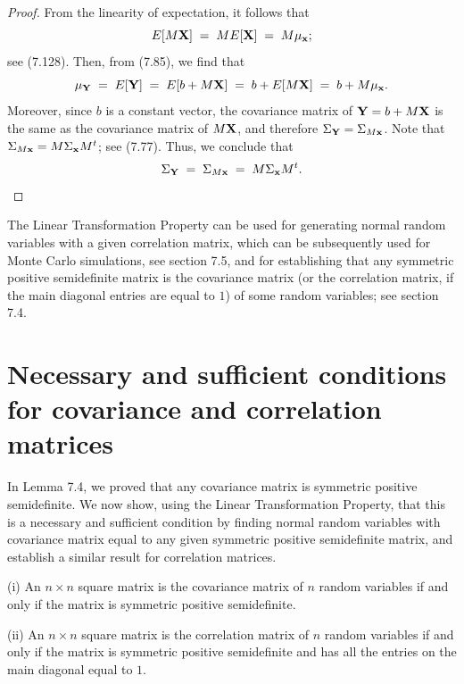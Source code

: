 \begin{proof}
From the linearity of expectation, it follows that
\begin{equation}
E\!\left[M\mathbf{X}\right] \;=\; ME\!\left[\mathbf{X}\right] \;=\; M\mu_{\mathbf{x}};
\end{equation}
see (7.128). Then, from (7.85), we find that
\[
\mu_{\mathbf{Y}} \;=\; E\!\left[\mathbf{Y}\right] \;=\; E\!\left[b+M\mathbf{X}\right] \;=\; b + E\!\left[M\mathbf{X}\right] \;=\; b + M\mu_{\mathbf{x}}.
\]
Moreover, since $b$ is a constant vector, the covariance matrix of $\mathbf{Y} = b +
M\mathbf{X}$ is the same as the covariance matrix of $M\mathbf{X}$, and therefore
$\Sigma_{\mathbf{Y}} = \Sigma_{M\mathbf{x}}$. Note that $\Sigma_{M\mathbf{x}} = M\Sigma_{\mathbf{x}}M^t$;
see (7.77). Thus, we conclude that
\[
\Sigma_{\mathbf{Y}} \;=\; \Sigma_{M\mathbf{x}} \;=\; M\Sigma_{\mathbf{x}}M^t.
\]
\end{proof}

The Linear Transformation Property can be used for generating normal random
variables with a given correlation matrix, which can be subsequently used for
Monte Carlo simulations, see section 7.5, and for establishing that any symmetric
positive semidefinite matrix is the covariance matrix (or the correlation matrix,
if the main diagonal entries are equal to $1$) of some random variables; see
section 7.4.

\section{Necessary and sufficient conditions for covariance and correlation matrices}

In Lemma 7.4, we proved that any covariance matrix is symmetric positive
semidefinite. We now show, using the Linear Transformation Property, that this is
a necessary and sufficient condition by finding normal random variables with
covariance matrix equal to any given symmetric positive semidefinite matrix, and
establish a similar result for correlation matrices.

\begin{theorem}
(i) An $n \times n$ square matrix is the covariance matrix of $n$ random variables
if and only if the matrix is symmetric positive semidefinite.

(ii) An $n \times n$ square matrix is the correlation matrix of $n$ random
variables if and only if the matrix is symmetric positive semidefinite and has
all the entries on the main diagonal equal to $1$.
\end{theorem}


